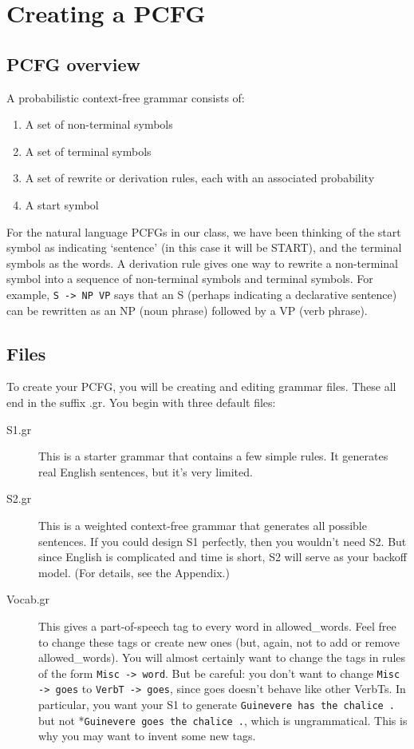\documentclass[12pt]{article}
\begin{document}
\section*{Creating a PCFG}
\subsection*{PCFG overview}

A probabilistic context-free grammar consists of:

\begin{enumerate}
	\item A set of non-terminal symbols
	\item A set of terminal symbols
	\item A set of rewrite or derivation rules, each with an associated probability
	\item A start symbol
\end{enumerate}


For the natural language PCFGs in our class, we have been thinking of the start symbol as indicating `sentence' (in this case it will be START), and the terminal symbols as the words.  A derivation rule gives one way to rewrite a non-terminal symbol into a sequence of non-terminal symbols and terminal symbols. For example, \verb+S -> NP VP+ says that an S (perhaps indicating a declarative sentence) can be rewritten as an NP (noun phrase) followed by a VP (verb phrase).

\subsection*{Files}

To create your PCFG, you will be creating and editing grammar files. These all end in the suffix .gr.  You begin with three default files:

\begin{description}
	\item[S1.gr]
   This is a starter grammar that contains a few simple rules. It generates real English
  sentences, but it's very limited.
  
	\item[S2.gr]
   This is a weighted context-free grammar that generates all possible sentences. If you could design S1 perfectly, then you wouldn't need S2. But since English is complicated and time is short, S2 will serve as your backoff model. (For details, see the Appendix.)
 
	\item[Vocab.gr]
   This gives a part-of-speech tag to every word in allowed\_words. Feel free to change
  these tags or create new ones (but, again, not to add or remove allowed\_words). You will almost certainly want to change the tags in rules of the form \verb+Misc -> word+. But be careful: you don't want to change \verb+Misc -> goes+ to \verb +VerbT -> goes+, since goes doesn't behave like other VerbTs. In particular, you want your S1 to generate \verb+Guinevere has the chalice .+ but not *\verb+Guinevere goes the chalice .+, which is ungrammatical. This is why you may want to invent some new tags.
\end{description}
\end{document}
